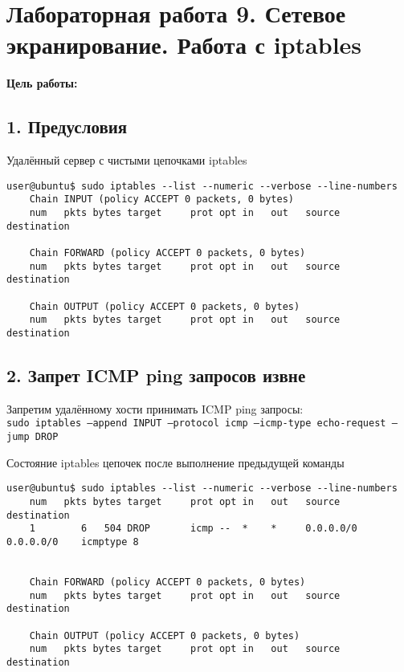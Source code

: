 \chapter*{Лабораторная работа 9. Сетевое экранирование. Работа с iptables}

\textbf{Цель работы:} 

\section*{1. Предусловия}

Удалённый сервер с чистыми цепочками iptables
\begin{Verbatim}[frame=single,breaklines=true,breakanywhere=true]
    user@ubuntu$ sudo iptables --list --numeric --verbose --line-numbers
    Chain INPUT (policy ACCEPT 0 packets, 0 bytes)
    num   pkts bytes target     prot opt in   out   source    destination

    Chain FORWARD (policy ACCEPT 0 packets, 0 bytes)
    num   pkts bytes target     prot opt in   out   source    destination

    Chain OUTPUT (policy ACCEPT 0 packets, 0 bytes)
    num   pkts bytes target     prot opt in   out   source    destination
\end{Verbatim}


\section*{2. Запрет ICMP ping запросов извне}

Запретим удалённому хости принимать ICMP ping запросы:\\
\texttt{sudo iptables --append INPUT --protocol icmp --icmp-type echo-request --jump DROP}

Состояние iptables цепочек после выполнение предыдущей команды
\begin{Verbatim}[frame=single,breaklines=true,breakanywhere=true]
    user@ubuntu$ sudo iptables --list --numeric --verbose --line-numbers
    num   pkts bytes target     prot opt in   out   source    destination
    1        6   504 DROP       icmp --  *    *     0.0.0.0/0 0.0.0.0/0    icmptype 8
    

    Chain FORWARD (policy ACCEPT 0 packets, 0 bytes)
    num   pkts bytes target     prot opt in   out   source    destination

    Chain OUTPUT (policy ACCEPT 0 packets, 0 bytes)
    num   pkts bytes target     prot opt in   out   source    destination
\end{Verbatim}

